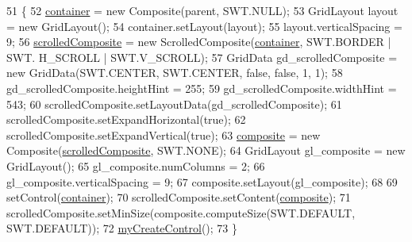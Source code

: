 \begin{DoxyCode}
51                                                 \{
52         \hyperlink{classit_1_1isislab_1_1masonassisteddocumentation_1_1mason_1_1wizards_1_1_h___environment_page_a77ebe828c5c45ce8b60db94f30d94203}{container} = \textcolor{keyword}{new} Composite(parent, SWT.NULL);
53         GridLayout layout = \textcolor{keyword}{new} GridLayout();
54         container.setLayout(layout);
55         layout.verticalSpacing = 9;     
56         \hyperlink{classit_1_1isislab_1_1masonassisteddocumentation_1_1mason_1_1wizards_1_1_h___environment_page_ae9781527e7827259c98bd07246e9cce0}{scrolledComposite} = \textcolor{keyword}{new} ScrolledComposite(\hyperlink{classit_1_1isislab_1_1masonassisteddocumentation_1_1mason_1_1wizards_1_1_h___environment_page_a77ebe828c5c45ce8b60db94f30d94203}{container}, SWT.BORDER | SWT.
      H\_SCROLL | SWT.V\_SCROLL);           
57         GridData gd\_scrolledComposite = \textcolor{keyword}{new} GridData(SWT.CENTER, SWT.CENTER, \textcolor{keyword}{false}, \textcolor{keyword}{false}, 1, 1);
58         gd\_scrolledComposite.heightHint = 255;
59         gd\_scrolledComposite.widthHint = 543;
60         scrolledComposite.setLayoutData(gd\_scrolledComposite);
61         scrolledComposite.setExpandHorizontal(\textcolor{keyword}{true});
62         scrolledComposite.setExpandVertical(\textcolor{keyword}{true});      
63         \hyperlink{classit_1_1isislab_1_1masonassisteddocumentation_1_1mason_1_1wizards_1_1_h___environment_page_a08701d3343b8c6232831af0077e6cb37}{composite} = \textcolor{keyword}{new} Composite(\hyperlink{classit_1_1isislab_1_1masonassisteddocumentation_1_1mason_1_1wizards_1_1_h___environment_page_ae9781527e7827259c98bd07246e9cce0}{scrolledComposite}, SWT.NONE);
64         GridLayout gl\_composite = \textcolor{keyword}{new} GridLayout();
65         gl\_composite.numColumns = 2;
66         gl\_composite.verticalSpacing = 9;
67         composite.setLayout(gl\_composite);
68         
69         setControl(\hyperlink{classit_1_1isislab_1_1masonassisteddocumentation_1_1mason_1_1wizards_1_1_h___environment_page_a77ebe828c5c45ce8b60db94f30d94203}{container});
70         scrolledComposite.setContent(\hyperlink{classit_1_1isislab_1_1masonassisteddocumentation_1_1mason_1_1wizards_1_1_h___environment_page_a08701d3343b8c6232831af0077e6cb37}{composite});
71         scrolledComposite.setMinSize(composite.computeSize(SWT.DEFAULT, SWT.DEFAULT));  
72         \hyperlink{classit_1_1isislab_1_1masonassisteddocumentation_1_1mason_1_1wizards_1_1_h___environment_page_a99746d862f89a4dad13af734914642cf}{myCreateControl}();
73     \}
\end{DoxyCode}


